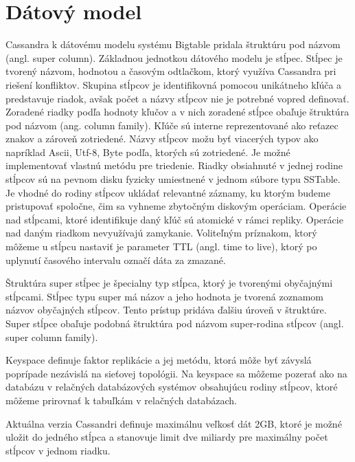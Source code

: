 \documentclass[11pt,twoside,a4paper]{book}
\begin{document}
\section{Dátový model}
Cassandra k dátovému modelu systému Bigtable pridala štruktúru pod názvom  (angl. super column). Základnou jednotkou dátového modelu je stĺpec. Stĺpec je tvorený názvom, hodnotou a časovým odtlačkom, ktorý využíva Cassandra pri riešení konfliktov. Skupina stĺpcov je identifikovná pomocou unikátneho kľúča a predstavuje riadok, avšak počet a názvy stĺpcov nie je potrebné vopred definovať. Zoradené riadky podľa hodnoty kľučov a v nich zoradené stĺpce obaľuje štruktúra pod názvom  (ang. column family). Kľúče sú interne reprezentované ako reťazec znakov a zároveň zotriedené. Názvy stĺpcov možu byť viacerých typov ako napríklad Ascii, Utf-8, Byte podľa, ktorých sú zotriedené. Je možné implementovať vlastnú metódu pre triedenie. Riadky obsiahnuté v jednej rodine stĺpcov sú na pevnom disku fyzicky umiestnené v jednom súbore typu SSTable. Je vhodné do rodiny stĺpcov ukládať relevantné záznamy, ku ktorým budeme pristupovať spoločne, čim sa vyhneme zbytočným diskovým operáciam. Operácie nad stĺpcami, ktoré identifikuje daný kľúč sú atomické v rámci repliky. Operácie nad daným riadkom nevyužívajú zamykanie. Voliteľným príznakom, ktorý môžeme u stĺpcu nastaviť je parameter TTL (angl. time to live), ktorý po uplynutí časového intervalu označí dáta za zmazané.

Štruktúra super stĺpec je špecialny typ stĺpca, ktorý je tvorenými obyčajnými stĺpcami. Stĺpec typu super má názov a jeho hodnota je tvorená zoznamom názvov obyčajných stĺpcov. Tento prístup pridáva ďalšiu úroveň v štruktúre. Super stĺpce obaľuje podobná štruktúra pod názvom super-rodina stĺpcov (angl. super column family). 

Keyspace definuje faktor replikácie a jej metódu, ktorá môže byť závyslá poprípade nezávislá na sieťovej topológii. Na keyspace sa môžeme pozerať ako na databázu v relačných databázových systémov obsahujúcu rodiny stĺpcov, ktoré môžeme prirovnať k tabuľkám v relačných databázach.

Aktuálna verzia Cassandri definuje maximálnu veľkosť dát 2GB, ktoré je možné uložit do jedného stĺpca a stanovuje limit dve miliardy pre maximálny počet stĺpcov v jednom riadku. 

\end{document}
